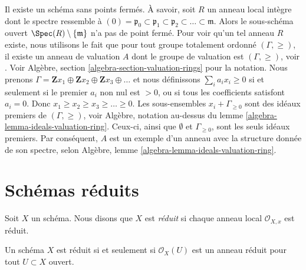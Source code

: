 \begin{example}
\label{example-scheme-without-closed-points}
Il existe un schéma sans points fermés. À savoir,
soit $R$ un anneau local intègre dont le spectre ressemble
à $(0) =
\mathfrak p_0 \subset \mathfrak p_1 \subset \mathfrak p_2 \subset \ldots
\subset \mathfrak m$. Alors le sous-schéma ouvert $\Spec(R) \setminus
\{\mathfrak m\}$ n'a pas de point fermé. Pour voir qu'un
tel anneau $R$ existe, nous utilisons le fait que pour tout groupe
totalement ordonné $(\Gamma, \geq)$, il existe un anneau
de valuation $A$ dont le groupe de valuation est $(\Gamma, \geq)$, voir \cite{Krull}.
Voir Algèbre, section \ref{algebra-section-valuation-rings} pour la notation. Nous
prenons $\Gamma =
\mathbf{Z}x_1 \oplus \mathbf{Z}x_2 \oplus \mathbf{Z}x_3 \oplus \ldots$ et nous définissons
$\sum_i a_i x_i \geq 0$ si et seulement si le premier $a_i$ non
nul est $> 0$, ou si tous les coefficients satisfont $a_i =
0$. Donc $x_1 \geq x_2 \geq x_3 \geq \ldots \geq 0$.
Les sous-ensembles $x_i + \Gamma_{\geq 0}$ sont des idéaux
premiers de $(\Gamma, \geq)$, voir Algèbre, notation
au-dessus du lemme \ref{algebra-lemma-ideals-valuation-ring}. Ceux-ci,
ainsi que $\emptyset$ et $\Gamma_{\geq 0}$, sont les seuls idéaux premiers.
Par conséquent, $A$ est un exemple d'un anneau avec la structure donnée
de son spectre,
selon Algèbre, lemme \ref{algebra-lemma-ideals-valuation-ring}.
\end{example}



















\section{Schémas réduits}
\label{section-reduced}

\begin{definition}
\label{definition-reduced}
Soit $X$ un schéma. Nous disons que $X$ est {\it réduit} si chaque anneau local
$\mathcal{O}_{X, x}$ est réduit.
\end{definition}

\begin{lemma}
\label{lemma-reduced}
Un schéma $X$ est réduit si et seulement si $\mathcal{O}_X(U)$ est
un anneau réduit pour tout $U \subset X$ ouvert.
\end{lemma}


